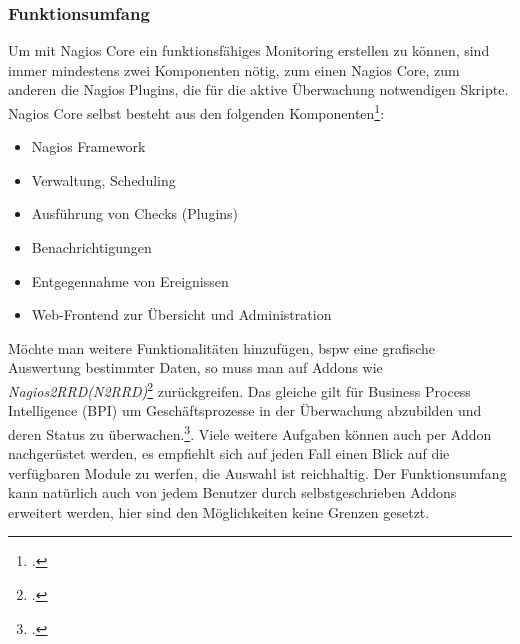 \documentclass[12pt,a4paper,parskip,listof=totoc,bibliography=totoc]{scrreprt}
\begin{document}
	\subsubsection{Funktionsumfang}
	Um mit Nagios Core ein funktionsfähiges Monitoring erstellen zu können, sind immer mindestens zwei Komponenten nötig, zum einen Nagios Core, zum anderen die Nagios Plugins, die für die aktive Überwachung notwendigen Skripte.
	Nagios Core selbst besteht aus den folgenden Komponenten\footcite{veltnagios1}:
	\begin{itemize}
		\item Nagios Framework
		\item Verwaltung, Scheduling
		\item Ausführung von Checks (Plugins)
		\item Benachrichtigungen
		\item Entgegennahme von Ereignissen
		\item Web-Frontend zur Übersicht und Administration
	\end{itemize}
	Möchte man weitere Funktionalitäten hinzufügen, \acrlong{bspw} eine grafische Auswertung bestimmter Daten, so muss man auf Addons wie \textit{Nagios2RRD(N2RRD)}\footcite{n2rrdprojecthome} zurückgreifen. Das gleiche gilt für Business Process Intelligence (BPI) um Geschäftsprozesse in der Überwachung abzubilden und deren Status zu überwachen.\footcite{nagiosbpi}. Viele weitere Aufgaben können auch per Addon \glqq nachgerüstet \grqq werden, es empfiehlt sich auf jeden Fall einen Blick auf die verfügbaren Module zu werfen, die Auswahl ist reichhaltig. Der Funktionsumfang kann natürlich auch von jedem Benutzer durch selbstgeschrieben Addons erweitert werden, hier sind den Möglichkeiten keine Grenzen gesetzt.
	
	
\end{document}
